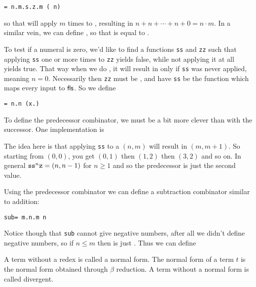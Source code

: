 \smallskip
\centerline{\tt \times = \lambda n.\lambda m.\lambda s.\lambda z.m (\plus\ n) }

so that  will apply  $m$ times to , resulting in $n+n+\cdots+n+0=n\cdot m$.
In a similar vein, we can define , so that  is equal to .

To test if a numeral is zero, we'd like to find a functions {\tt ss} and {\tt zz} such that applying {\tt ss} one or more times to {\tt zz} yields false, while not applying it at all yields true.
That way when we do , it will result in \tru{} only if {\tt ss} was never applied, meaning $n=0$.
Necessarily then {\tt zz} must be \tru, and have {\tt ss} be the function which maps every input to ${\sf fls}$.
So we define

\smallskip
\centerline{\tt\iszro = \lambda n.n (\lambda x.\fls) \tru}

To define the predecessor combinator, we must be a bit more clever than with the successor.
One implementation is

\smallskip
\centerline{\vbox{}}

The idea here is that applying {\tt ss} to a $(n,m)$ will result in $(m,m+1)$.
So starting from $(0,0)$, you get $(0,1)$ then $(1,2)$ then $(3,2)$ and so on.
In general ${\tt ss}^n{\tt z}=(n,n-1)$ for $n\geq1$ and so the predecessor is just the second value.

Using the predecessor combinator we can define a subtraction combinator similar to addition:

\smallskip
\centerline{\tt sub= \lambda m.\lambda n.m \prd n}

Notice though that {\tt sub} cannot give negative numbers, after all we didn't define negative numbers, so if $n\leq m$ then  is just .
Thus we can define

\smallskip
{}

\bdefn

    A term without a redex is called a {\emphcolor normal form}.
    The normal form of a term $t$ is the normal form obtained through $\beta$ reduction.
    A term without a normal form is called {\emphcolor divergent}.

